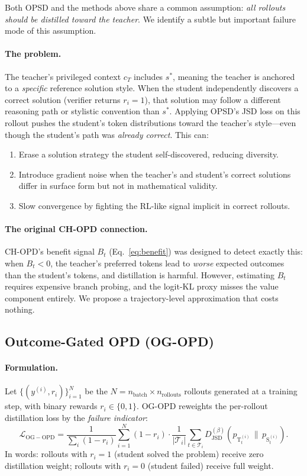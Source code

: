 \documentclass[11pt]{article}
\newcommand{\pT}{p_{\mathrm{T}}}
\newcommand{\pS}{p_{\mathrm{S}}}
\newcommand{\JSD}{\mathrm{JSD}}
\begin{document}
Both OPSD and the methods above share a common assumption: \emph{all rollouts should be
distilled toward the teacher}.  We identify a subtle but important failure mode of this
assumption.

\paragraph{The problem.}
The teacher's privileged context $c_T$ includes $s^*$, meaning the teacher is anchored to a
\emph{specific} reference solution style.  When the student independently discovers a
correct solution (verifier returns $r_i = 1$), that solution may follow a different
reasoning path or stylistic convention than $s^*$.  Applying OPSD's JSD loss on this
rollout pushes the student's token distributions toward the teacher's style—even though the
student's path was \emph{already correct}.  This can:
\begin{enumerate}
\item Erase a solution strategy the student self-discovered, reducing diversity.
\item Introduce gradient noise when the teacher's and student's correct solutions differ in
      surface form but not in mathematical validity.
\item Slow convergence by fighting the RL-like signal implicit in correct rollouts.
\end{enumerate}

\paragraph{The original CH-OPD connection.}
CH-OPD's benefit signal $B_t$ (Eq.~\ref{eq:benefit}) was designed to detect exactly this:
when $B_t < 0$, the teacher's preferred tokens lead to \emph{worse} expected outcomes than
the student's tokens, and distillation is harmful.  However, estimating $B_t$ requires
expensive branch probing, and the logit-KL proxy misses the value component entirely.  We
propose a trajectory-level approximation that costs nothing.

\subsection{Outcome-Gated OPD (OG-OPD)}

\paragraph{Formulation.}
Let $\{(y^{(i)}, r_i)\}_{i=1}^{N}$ be the $N = n_{\mathrm{batch}} \times n_{\mathrm{rollouts}}$
rollouts generated at a training step, with binary rewards $r_i \in \{0,1\}$.
OG-OPD reweights the per-rollout distillation loss by the \emph{failure indicator}:
\begin{equation}
  \boxed{
  \mathcal{L}_{\mathrm{OG-OPD}}
  = \frac{1}{\sum_i (1-r_i)}
    \sum_{i=1}^{N} (1-r_i)\cdot
    \frac{1}{|\mathcal{T}_i|}\sum_{t \in \mathcal{T}_i}
    D_{\JSD}^{(\beta)}\!\left(\pT_t^{(i)} \,\|\, \pS_t^{(i)}\right).
  }
  \label{eq:og-opd}
\end{equation}
In words: rollouts with $r_i=1$ (student solved the problem) receive zero distillation
weight; rollouts with $r_i=0$ (student failed) receive full weight.
\end{document}
